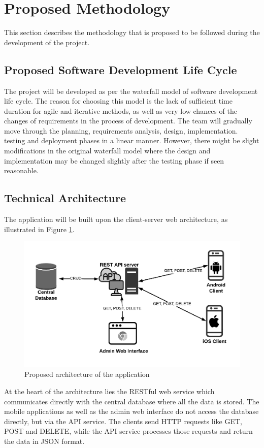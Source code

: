 \documentclass[12pt, a4paper, oneside]{article}
\begin{document}
\break
\section{Proposed Methodology}
This section describes the methodology that is proposed to be followed during the development of the project.

\subsection{Proposed Software Development Life Cycle}
The project will be developed as per the waterfall model of software development life cycle. The reason for choosing this model is the lack of sufficient time duration for agile and iterative methods, as well as very low chances of the changes of requirements in the process of development. The team will gradually move through the planning, requirements analysis, design, implementation. testing and deployment phases in a linear manner. However, there might be slight modifications in the original waterfall model where the design and implementation may be changed slightly after the testing phase if seen reasonable.

\subsection{Technical Architecture}
The application will be built upon the client-server web architecture, as illustrated in Figure \ref{fig:arch}.

\begin{figure}[h]
\includegraphics[width=\linewidth]{architecture}
\centering
\caption{Proposed architecture of the application}
\label{fig:arch}
\end{figure}

At the heart of the architecture lies the RESTful web service which communicates directly with the central database where all the data is stored. The mobile applications as well as the admin web interface do not access the database directly, but via the API service. The clients send HTTP requests like GET, POST and DELETE, while the API service processes those requests and return the data in JSON format.
\end{document}
